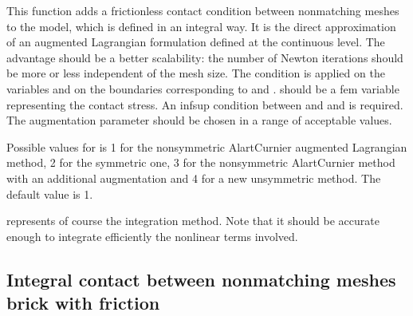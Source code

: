 \documentclass[a4paper,11pt,english]{sphinxmanual}
\begin{document}
This function adds a frictionless contact condition between nonmatching meshes
to the model, which is defined in an integral way. It is the direct
approximation of an augmented Lagrangian formulation defined at the
continuous level.
The advantage should be a better scalability: the number of Newton
iterations should be more or less independent of the mesh size.
The condition is applied on the variables  and
 on the boundaries corresponding to  and
.
 should be a fem variable representing the contact stress.
An inf\sphinxhyphen{}sup condition between  and  and
 is required.
The augmentation parameter  should be chosen in a
range of acceptable values.

Possible values for  is 1 for the non\sphinxhyphen{}symmetric Alart\sphinxhyphen{}Curnier
augmented Lagrangian method, 2 for the symmetric one, 3 for the
non\sphinxhyphen{}symmetric Alart\sphinxhyphen{}Curnier method with an additional augmentation
and 4 for a new unsymmetric method. The default value is 1.

 represents of course the integration method. Note that it should
be accurate enough to integrate efficiently the nonlinear terms involved.


\subsection{Integral contact between non\sphinxhyphen{}matching meshes brick with friction}
\label{\detokenize{userdoc/model_contact_friction:integral-contact-between-non-matching-meshes-brick-with-friction}}
\begin{sphinxVerbatim}[commandchars=\\\{\}]
         
          
             
\end{sphinxVerbatim}
\end{document}
